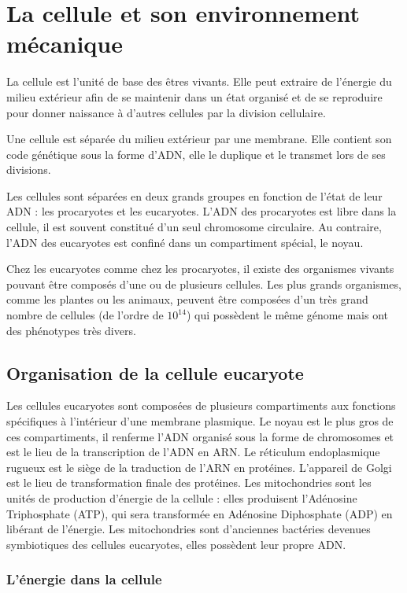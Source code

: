 \documentclass{report}
\begin{document}
\chapter{La cellule et son environnement mécanique}


La cellule est l'unité de base des êtres vivants. Elle peut extraire de l'énergie du milieu extérieur afin de se maintenir dans un état organisé et de se reproduire pour donner naissance à d'autres cellules par la division cellulaire. 

Une cellule est séparée du milieu extérieur par une membrane. Elle contient son code génétique sous la forme d'ADN, elle le duplique et le transmet lors de ses divisions. 

Les cellules sont séparées en deux grands groupes en fonction de l'état de leur ADN : les procaryotes et les eucaryotes. 
L'ADN des procaryotes est libre dans la cellule, il est souvent constitué d'un seul chromosome circulaire. 
Au contraire, l'ADN des eucaryotes est confiné dans un compartiment spécial, le noyau. 

Chez les eucaryotes comme chez les procaryotes, il existe des organismes vivants pouvant être composés d'une ou de plusieurs cellules. 
Les plus grands organismes, comme les plantes ou les animaux, peuvent être composées d'un très grand nombre de cellules (de l'ordre de $10^{14}$) qui possèdent le même génome mais ont des phénotypes très divers. 

\section{Organisation de la cellule eucaryote}


Les cellules eucaryotes sont composées de plusieurs compartiments aux fonctions spécifiques à l'intérieur d'une membrane plasmique. Le noyau est le plus gros de ces compartiments, il renferme l'ADN organisé sous la forme de chromosomes et est le lieu de la transcription de l'ADN en ARN. 
Le réticulum endoplasmique rugueux est le siège de la traduction de l'ARN en protéines. 
L'appareil de Golgi est le lieu de transformation finale des protéines. 
Les mitochondries sont les unités de production d'énergie de la cellule : elles produisent l'Adénosine Triphosphate (ATP), qui sera transformée en Adénosine Diphosphate (ADP) en libérant de l'énergie. Les mitochondries sont d'anciennes bactéries devenues symbiotiques des cellules eucaryotes, elles possèdent leur propre ADN. 

\subsection{L'énergie dans la cellule}
\end{document}
